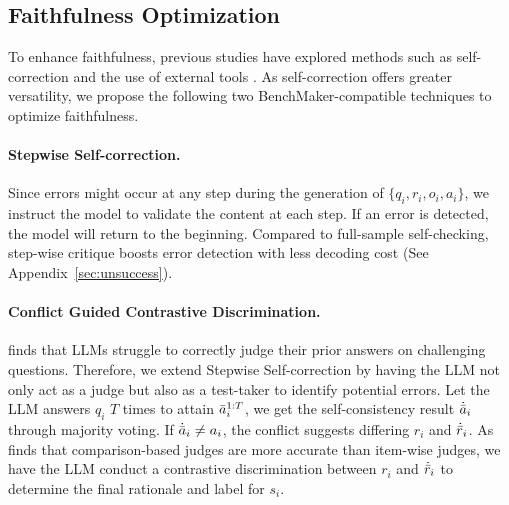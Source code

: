 \subsection{Faithfulness Optimization}
\label{sec:fat_opt}
To enhance faithfulness, previous studies have explored methods such as self-correction \citep{SelfIns,SelfReflect} and the use of external tools \citep{solver,rag}. As self-correction offers greater versatility, we propose the following two BenchMaker-compatible techniques to optimize faithfulness.
\paragraph{Stepwise Self-correction.}Since errors might occur at any step during the generation of $\{q_i,r_i,o_i,a_i\}$, we instruct the model to validate the content at each step. If an error is detected, the model will return to the beginning. Compared to full-sample self-checking, step-wise critique boosts error detection with less decoding cost (See Appendix~\ref{sec:unsuccess}).
\paragraph{Conflict Guided Contrastive Discrimination.} 
\citet{cannotselfcritic} finds that LLMs struggle to correctly judge their prior answers on challenging questions. 
Therefore, we extend Stepwise Self-correction by having the LLM not only act as a judge but also as a test-taker to identify potential errors. Let the LLM answers $q_i$ $T$ times to attain $\Bar{a}_i^{1:T}$, we get the self-consistency \citep{sc} result $\Dot{\Bar{a}}_i$ through majority voting. If $\Dot{\Bar{a}}_i \neq a_i$, the conflict suggests differing $r_i$ and $\Dot{\Bar{r}}_i$. As \citet{llmasjudge} finds that comparison-based judges are more accurate than item-wise judges, we have the LLM conduct a contrastive discrimination between $r_i$ and $\Dot{\Bar{r}}_i$ to determine the final rationale and label for $s_i$.

